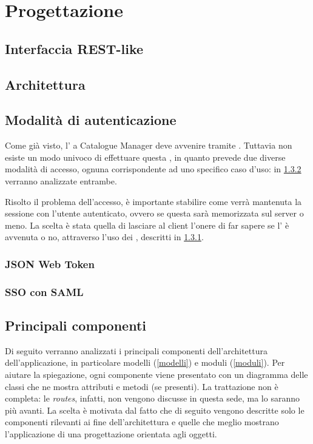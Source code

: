 \chapter{Progettazione} \label{progettazione}

\section{Interfaccia REST-like}


\section{Architettura}


\section{Modalità di autenticazione}
Come già visto, l' a Catalogue Manager deve avvenire tramite . Tuttavia non esiste un modo univoco di effettuare questa , in quanto  prevede due diverse modalità di accesso, ognuna corrispondente ad uno specifico caso d'uso: in \ref{ssoSAML} verranno analizzate entrambe. 

Risolto il problema dell'accesso, è importante stabilire come verrà mantenuta la sessione con l'utente autenticato, ovvero se questa sarà memorizzata sul server o meno. La scelta è stata quella di lasciare al client l'onere di far sapere se l' è avvenuta o no, attraverso l'uso dei , descritti in \ref{descrJWT}.

\subsection{JSON Web Token} \label{descrJWT}


\subsection{SSO con SAML} \label{ssoSAML}


\section{Principali componenti} 
Di seguito verranno analizzati i principali componenti dell'architettura dell'applicazione, in particolare modelli (\ref{modelli}) e moduli (\ref{moduli}). Per aiutare la spiegazione, ogni componente viene presentato con un diagramma delle classi che ne mostra attributi e metodi (se presenti). La trattazione non è completa: le \textit{routes}, infatti, non vengono discusse in questa sede, ma lo saranno più avanti. La scelta è motivata dal fatto che di seguito vengono descritte solo le componenti rilevanti ai fine dell'architettura e quelle che meglio mostrano l'applicazione di una progettazione orientata agli oggetti. 
 
